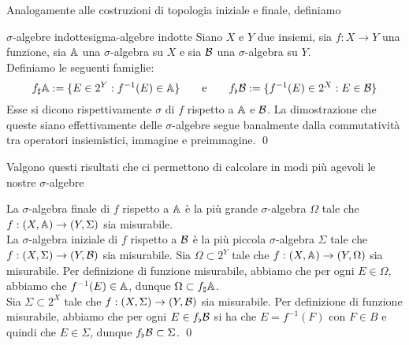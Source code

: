 \documentclass[openany]{book}
\begin{document}
Analogamente alle costruzioni di topologia iniziale e finale, definiamo 

\begin{definition}{$\sigma$-algebre indotte}{sigma-algebre indotte}
    Siano $X$ e $Y$ due insiemi, sia $f : X \to Y$ una funzione, sia $\mathbb{A}$ una $\sigma$-algebra su $X$ e sia $\mathcal{B}$ una $\sigma$-algebra su $Y$.\\
    Definiamo le seguenti famiglie:
    \[f_\sharp \mathbb{A} := \{E \in 2^Y : f^{-1}(E)\in \mathbb{A}\}\qquad \text{e}\qquad f_\flat\mathcal{B} := \{f^{-1}(E) \in 2^X : E \in \mathcal{B} \}\]
    Esse si dicono rispettivamente $\sigma$ di $f$ rispetto a $\mathbb{A}$ e $\mathcal{B}$.
    \proof 
    La dimostrazione che queste siano effettivamente delle $\sigma$-algebre segue banalmente dalla commutatività tra operatori insiemistici, immagine e preimmagine.
    \qed
\end{definition}

Valgono questi risultati che ci permettono di calcolare in modi più agevoli le nostre $\sigma$-algebre

\begin{proposition}{}{}
    La $\sigma$-algebra finale di $f$ rispetto a $\mathbb{A}$ è la più grande $\sigma$-algebra $\Omega$ tale che $f : (X,\mathbb{A})\to (Y,\Sigma)$ sia misurabile.\\
    La $\sigma$-algebra iniziale di $f$ rispetto a $\mathcal{B}$ è la più piccola $\sigma$-algebra $\Sigma$ tale che $f : (X,\Sigma)\to (Y,\mathcal{B})$ sia misurabile.
    \proof
    Sia $\Omega \subset 2^Y$ tale che $f : (X,\mathbb{A})\to (Y,\Omega)$ sia misurabile. Per definizione di funzione misurabile, abbiamo che per ogni $E \in \Omega$, abbiamo che $f^{-1}(E)\in \mathbb{A}$, dunque $\Omega\subset f_\sharp\mathbb{A}$.\\
    Sia $\Sigma \subset 2^X$ tale che $f : (X,\Sigma)\to (Y,\mathcal{B})$ sia misurabile. Per definizione di funzione misurabile, abbiamo che per ogni $E \in f_\flat\mathcal{B}$ si ha che $E = f^{-1}(F)$ con $F \in B$ e quindi che $E \in \Sigma$, dunque $f_\flat\mathcal{B}\subset \Sigma$.
    \qed
\end{proposition}
\end{document}
